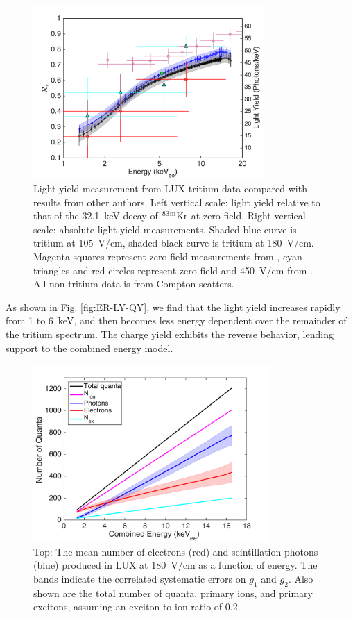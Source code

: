 \begin{figure}[h!]
\includegraphics[width=88mm]{fig/Re_LY_log.png}
\caption{Light yield measurement from LUX tritium data compared with results from other authors. Left vertical scale: light yield relative to that of the 32.1~keV decay of $\rm ^{83m}Kr $ at zero field. Right vertical scale: absolute light yield measurements. Shaded blue curve is tritium at 105~V/cm, shaded black curve is tritium at 180~V/cm. Magenta squares represent zero field measurements from \cite{Aprile_LY}, cyan triangles and red circles represent zero field and 450~V/cm from \cite{Baudis}. All non-tritium data is from Compton scatters. }
\label{fig:Re_LY}
\end{figure}


As shown in Fig. \ref{fig:ER-LY-QY}, we find that the light yield increases rapidly from 1 to 6~keV, and then becomes less energy dependent over the remainder of the tritium spectrum. The charge yield exhibits the reverse behavior, lending support to the combined energy model. 

\begin{figure}[h!]
\includegraphics[width=90mm]{fig/quanta-vs-energy.png}
\caption{Top: The mean number of electrons (red) and scintillation photons (blue) produced in LUX at 180~V/cm as a function of energy. The bands indicate the correlated systematic errors on $g_1$ and $g_2$. Also shown are the total number of quanta, primary ions, and primary excitons, assuming an exciton to ion ratio of 0.2. }
\label{fig:quanta-vs-energy}
\end{figure}

